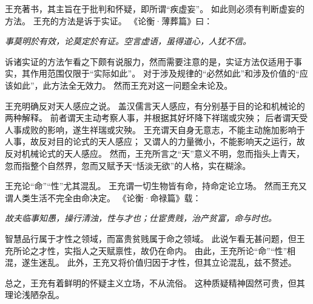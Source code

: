 \documentclass[11pt]{article}
\begin{document}
\par

王充著书，其主旨在于批判和怀疑，即所谓“疾虚妄”。
如此则必须有判断虚妄的方法。
王充的方法是诉于实证。
《论衡·薄葬篇》曰：

\textit{事莫明於有效，论莫定於有证。空言虚语，虽得道心，人犹不信。}

诉诸实证的方法乍看之下颇有说服力，然而需要注意的是，实证方法仅适用于事实，其作用范围仅限于“实际如此”。
对于涉及规律的“必然如此”和涉及价值的“应该如此”，此方法全无效力。
然而王充对这一问题全未论及。

\par

王充明确反对天人感应之说。
盖汉儒言天人感应，有分别基于目的论和机械论的两种解释。
前者谓天主动考察人事，并根据其好坏降下祥瑞或灾殃；
后者谓天受人事成败的影响，遂生祥瑞或灾殃。
王充谓天自身无意志，不能主动施加影响于人事，故反对目的论式的天人感应；
又谓人的力量微小，不能影响天之运行，故反对机械论式的天人感应。
然而，王充所言之“天”意义不明，忽而指头上青天，忽而指整个自然界，忽而又赋予天“恬淡无欲”的人格，实在糊涂。

\par

王充论“命”“性”尤其混乱。
王充谓一切生物皆有命，持命定论立场。
然而王充又谓人类生活不完全由命决定。
《论衡·命禄篇》载：

\textit{故夫临事知愚，操行清浊，性与才也；仕宦贵贱，治产贫富，命与时也。}

智慧品行属于才性之领域，而富贵贫贱属于命之领域。
此说乍看无甚问题，但王充所论之才性，实指人之天赋禀性，故仍在命内。
由此，王充所论“命”“性”相混，遂生迷乱。
此外，王充又将价值归因于才性，但其立论混乱，兹不赘述。

\par

总之，王充有着鲜明的怀疑主义立场，不从流俗。
这种质疑精神固然可贵，但其理论浅陋杂乱。
\end{document}
